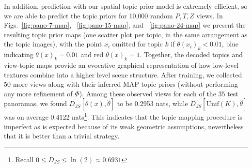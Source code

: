 In addition, prediction with our spatial topic prior model is extremely efficient, so we are able to predict the topic priors for 10,000 random $P,T,Z$ views. In Figs.~\ref{fig:pano-7-map}, ~\ref{fig:pano-15-map}, and ~\ref{fig:pano-24-map} we present the resulting topic prior maps (one scatter plot per topic, in the same arrangement as the topic images), with the point $x_i$ omitted for topic $k$ if $\theta(x_i)_k < 0.01$, blue indicating $\theta(x)_k = 0.01$ and red $\theta(x)_k = 1$. Together, the decoded topics and view-topic maps provide an evocative graphical representation of how low-level textures combine into a higher level scene structure. After training, we collected 50 more views along with their inferred MAP topic priors (without performing any more refinement of $\Phi$). Among these observed views for each of the 35 test panoramas, we found $D_{JS}[\theta(x), \hat{\theta}]$ to be 0.2953 nats, while $D_{JS}[\mathrm{Unif}(K), \hat{\theta}]$ was on average 0.4122 nats\footnote{Recall $0 \leq D_{JS} \leq \ln(2) \approx 0.6931$}. This indicates that the topic mapping procedure is imperfect as is expected because of its weak geometric assumptions, nevertheless that it is better than a trivial strategy.

